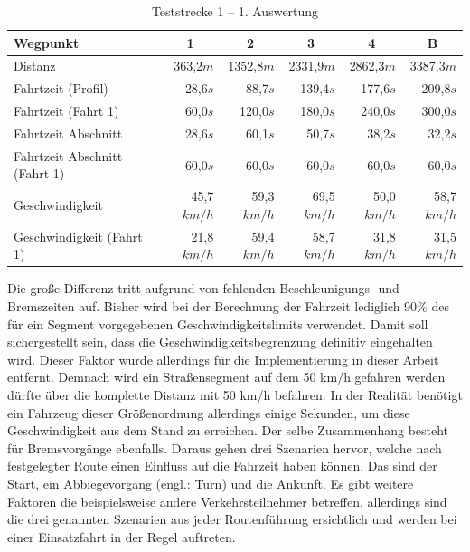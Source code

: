 \begin{table}[htb]
\centering
\small
\caption{Teststrecke 1 -- 1. Auswertung}
\label{tab:driveinit}
\begin{tabular}{|l|r|r|r|r|r|}
\hline
Wegpunkt                               & \multicolumn{1}{c|}{1} & \multicolumn{1}{c|}{2} & \multicolumn{1}{c|}{3} & \multicolumn{1}{c|}{4} & \multicolumn{1}{c|}{B}      \\ \hline
Distanz                                & 363,2$m$                & 1352,8$m$               & 2331,9$m$               & 2862,3$m$               & 3387,3$m$               \\ \hline
Fahrtzeit (Profil)                     & 28,6$s$                 & 88,7$s$                 & 139,4$s$                & 177,6$s$                & 209,8$s$                \\ \hline
Fahrtzeit (Fahrt 1)                  & 60,0$s$                 & 120,0$s$                & 180,0$s$                & 240,0$s$                & 300,0$s$                \\ \hline
Fahrtzeit Abschnitt                    & 28,6$s$                 & 60,1$s$                 & 50,7$s$                 & 38,2$s$                 & 32,2$s$                 \\ \hline
Fahrtzeit Abschnitt (Fahrt 1)        & 60,0$s$                 & 60,0$s$                 & 60,0$s$                 & 60,0$s$                 & 60,0$s$                 \\ \hline
Geschwindigkeit                        & 45,7$km/h$              & 59,3$km/h$              & 69,5$km/h$              & 50,0$km/h$              & 58,7$km/h$              \\ \hline
Geschwindigkeit (Fahrt 1)            & 21,8$km/h$              & 59,4$km/h$              & 58,7$km/h$              & 31,8$km/h$              & 31,5$km/h$              \\ \hline
\end{tabular}
\end{table}

Die große Differenz tritt aufgrund von fehlenden Beschleunigungs- und Bremszeiten auf.
Bisher wird bei der Berechnung der Fahrzeit lediglich 90$\%$ des für ein Segment vorgegebenen Geschwindigkeitslimits verwendet.
Damit soll sichergestellt sein, dass die Geschwindigkeitsbegrenzung definitiv eingehalten wird.
Dieser Faktor wurde allerdings für die Implementierung in dieser Arbeit entfernt.
Demnach wird ein Straßensegment auf dem 50 km/h gefahren werden dürfte über die komplette Distanz mit 50 km/h befahren.
In der Realität benötigt ein Fahrzeug dieser Größenordnung allerdings einige Sekunden, um diese Geschwindigkeit aus dem Stand zu erreichen.
Der selbe Zusammenhang besteht für Bremsvorgänge ebenfalls.
Daraus gehen drei Szenarien hervor, welche nach festgelegter Route einen Einfluss auf die Fahrzeit haben können.
Das sind der Start, ein Abbiegevorgang (engl.: Turn) und die Ankunft.
Es gibt weitere Faktoren die beispielsweise andere Verkehrsteilnehmer betreffen, allerdings sind die drei genannten Szenarien aus jeder Routenführung ersichtlich und werden bei einer Einsatzfahrt in der Regel auftreten.

